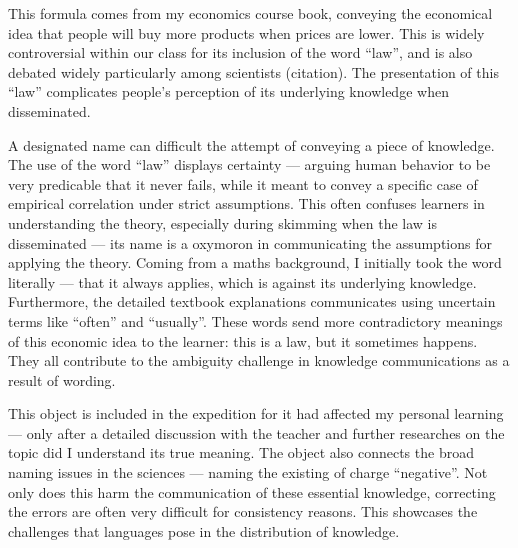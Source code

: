\documentclass[a4paper,11pt]{article}
\begin{document}
This formula comes from my economics course book, conveying the economical idea that people will buy more products when prices are lower. This is widely controversial within our class for its inclusion of the word ``law'', and is also debated widely particularly among scientists (citation). The presentation of this ``law'' complicates people's perception of its underlying knowledge when disseminated.

A designated name can difficult the attempt of conveying a piece of knowledge.
The use of the word ``law'' displays certainty --- arguing human behavior to be very predicable that it never fails, while it meant to convey a specific case of empirical correlation under strict assumptions. This often confuses learners in understanding the theory, especially during skimming when the law is disseminated  --- its name is a oxymoron in communicating the assumptions for applying the theory. Coming from a maths background, I initially took the word literally --- that it always applies, which is against its underlying knowledge. Furthermore, the detailed textbook explanations communicates using uncertain terms like ``often'' and ``usually''.
These words send more contradictory meanings of this economic idea to the learner: this is a law, but it sometimes happens. They all contribute to the ambiguity challenge in knowledge communications as a result of wording.

This object is included in the expedition for it had affected my personal learning --- only after a detailed discussion with the teacher and further researches on the topic did I understand its true meaning. The object also connects the broad naming issues in the sciences --- naming the existing of charge ``negative''. Not only does this harm the communication of these essential knowledge, correcting the errors are often very difficult for consistency reasons. This showcases the challenges that languages pose in the distribution of knowledge.

\end{document}
